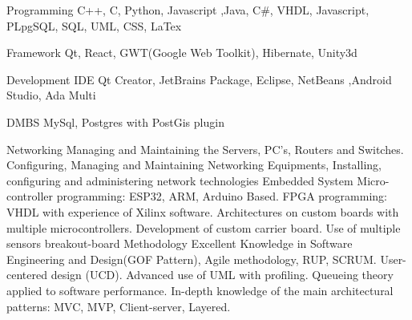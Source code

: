 


\begin{cvskills}


\cvskill
{Programming} %
{C++, C, Python, Javascript ,Java, C\#, VHDL, Javascript, PLpgSQL, SQL, UML, CSS, LaTex } %

\hline

\cvskill
{Framework} %
{Qt, React, GWT(Google Web Toolkit), Hibernate, Unity3d} %

\hline

\cvskill
{Development IDE} %
{Qt Creator, JetBrains Package, Eclipse, NetBeans ,Android Studio, Ada Multi} %

\hline


\cvskill
{DMBS} %
{MySql, Postgres with PostGis plugin} %

\hline

\cvskill
{Networking} %
{Managing and Maintaining the Servers, PC's, Routers and Switches.
	Configuring, Managing and Maintaining \newline Networking Equipments,
	Installing, configuring and \newline administering network technologies 
} %
\hline
\cvskill
{Embedded System} %
{Micro-controller programming: ESP32, ARM, Arduino Based.  \newline
 FPGA programming: VHDL with experience of Xilinx software.
 Architectures on custom boards with multiple microcontrollers. 
 Development of custom carrier board. Use of multiple sensors breakout-board
} %
\hline
\cvskill
{Methodology} %
{Excellent Knowledge in Software Engineering and Design(GOF Pattern), Agile methodology, RUP, SCRUM. \newline User-centered design (UCD).
 Advanced use of UML with profiling. Queueing theory applied to software \newline performance. In-depth knowledge of the main architectural patterns: MVC, MVP, Client-server, \newline Layered.
} %


\end{cvskills}
